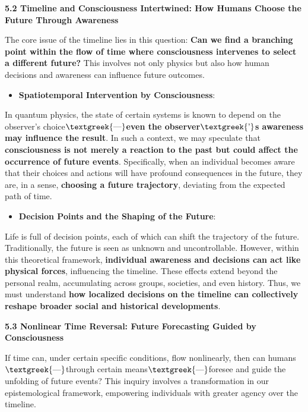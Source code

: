\documentclass[a4paper]{article}
\begin{document}
\textbf{5.2 Timeline and Consciousness Intertwined: How Humans Choose the Future Through Awareness}

The core issue of the timeline lies in this question: \textbf{Can we find a {\textquotedbl}branching
point{\textquotedbl} within the flow of time where consciousness intervenes to select a different future?} This
involves not only physics but also how human decisions and awareness can influence future outcomes.

\begin{itemize}[series=listWWNumxiv,label=[F0B7?]]
\item \textbf{Spatiotemporal Intervention by Consciousness}:
\end{itemize}
In quantum physics, the state of certain systems is known to depend on the observer's
choice$\text{\textgreek{—}}$\textbf{even the observer$\text{\textgreek{’}}$s awareness may influence the result}. In
such a context, we may speculate that \textbf{consciousness is not merely a reaction to the past but could affect the
occurrence of future events}. Specifically, when an individual becomes aware that their choices and actions will have
profound consequences in the future, they are, in a sense, \textbf{choosing a future trajectory}, deviating from the
expected path of time.

\begin{itemize}[resume*=listWWNumxiv]
\item \textbf{Decision Points and the Shaping of the Future}:
\end{itemize}
Life is full of decision points, each of which can shift the trajectory of the future. Traditionally, the future is seen
as unknown and uncontrollable. However, within this theoretical framework, \textbf{individual awareness and decisions
can act like physical forces}, influencing the timeline. These effects extend beyond the personal realm, accumulating
across groups, societies, and even history. Thus, we must understand \textbf{how localized decisions on the timeline
can collectively reshape broader social and historical developments}.

\textbf{5.3 Nonlinear Time Reversal: Future Forecasting Guided by Consciousness}

If time can, under certain specific conditions, flow nonlinearly, then can humans$\text{\textgreek{—}}$through certain
means$\text{\textgreek{—}}$foresee and guide the unfolding of future events? This inquiry involves a transformation in
our epistemological framework, empowering individuals with greater agency over the timeline.
\end{document}
